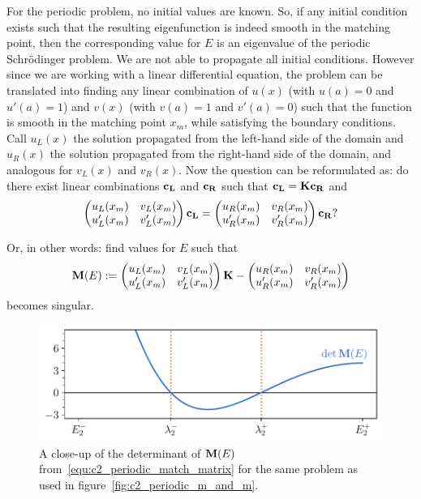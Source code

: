 For the periodic problem, no initial values are known. So, if any initial condition exists such that the resulting eigenfunction is indeed smooth in the matching point, then the corresponding value for $E$ is an eigenvalue of the periodic Schrödinger problem. We are not able to propagate all initial conditions. However since we are working with a linear differential equation, the problem can be translated into finding any linear combination of $u(x)$ (with $u(a) = 0$ and $u'(a)=1$) and $v(x)$ (with $v(a) = 1$ and $v'(a)=0$) such that the function is smooth in the matching point $x_m$, while satisfying the boundary conditions. Call $u_L(x)$ the solution propagated from the left-hand side of the domain and $u_R(x)$ the solution propagated from the right-hand side of the domain, and analogous for $v_L(x)$ and $v_R(x)$. Now the question can be reformulated as: do there exist linear combinations $\vb{c_L}$ and $\vb{c_R}$ such that $\vb{c_L} = \vb{K}\vb{c_R}$ and
$$
    \begin{pmatrix}
        u_L(x_m)  & v_L(x_m)  \\
        u'_L(x_m) & v'_L(x_m)
    \end{pmatrix} \vb{c_L} = \begin{pmatrix}
        u_R(x_m)  & v_R(x_m)  \\
        u'_R(x_m) & v'_R(x_m)
    \end{pmatrix}\vb{c_R}\text{?}
$$

Or, in other words: find values for $E$ such that
\begin{equation}\label{equ:c2_periodic_match_matrix}
    \vb{M}(E) := \begin{pmatrix}
        u_L(x_m)  & v_L(x_m)  \\
        u'_L(x_m) & v'_L(x_m)
    \end{pmatrix} \vb{K} - \begin{pmatrix}
        u_R(x_m)  & v_R(x_m)  \\
        u'_R(x_m) & v'_R(x_m)
    \end{pmatrix}
\end{equation}
becomes singular.

\begin{figure}
    \begin{center}
        \includegraphics[width=\textwidth]{img/chapter2/prufer/periodic_matching.pdf}
    \end{center}
    \caption{A close-up of the determinant of $\vb{M}(E)$ from~\eqref{equ:c2_periodic_match_matrix} for the same problem as used in figure~\ref{fig:c2_periodic_m_and_m}.}\label{fig:c2_periodic_matching}
\end{figure}

